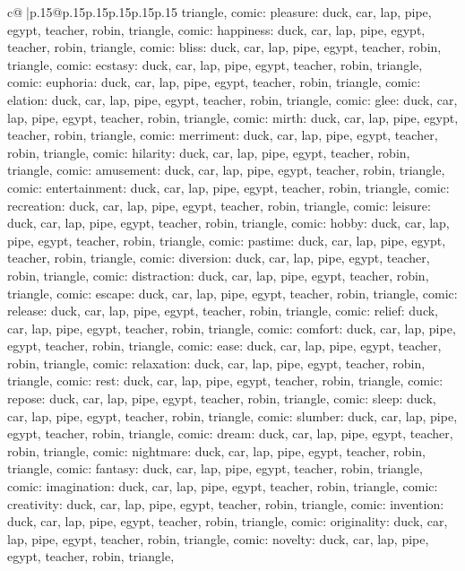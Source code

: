 \documentclass{article}
\begin{document}
{\begin{supertabular}{c@{$\;$}|p{.15\linewidth}@{}p{.15\linewidth}p{.15\linewidth}p{.15\linewidth}p{.15\linewidth}p{.15\linewidth}}
{{{triangle, comic\n\nCLUE: pleasure\nTARGETS: duck, car, lap, pipe, egypt, teacher, robin, triangle, comic\n\nCLUE: happiness\nTARGETS: duck, car, lap, pipe, egypt, teacher, robin, triangle, comic\n\nCLUE: bliss\nTARGETS: duck, car, lap, pipe, egypt, teacher, robin, triangle, comic\n\nCLUE: ecstasy\nTARGETS: duck, car, lap, pipe, egypt, teacher, robin, triangle, comic\n\nCLUE: euphoria\nTARGETS: duck, car, lap, pipe, egypt, teacher, robin, triangle, comic\n\nCLUE: elation\nTARGETS: duck, car, lap, pipe, egypt, teacher, robin, triangle, comic\n\nCLUE: glee\nTARGETS: duck, car, lap, pipe, egypt, teacher, robin, triangle, comic\n\nCLUE: mirth\nTARGETS: duck, car, lap, pipe, egypt, teacher, robin, triangle, comic\n\nCLUE: merriment\nTARGETS: duck, car, lap, pipe, egypt, teacher, robin, triangle, comic\n\nCLUE: hilarity\nTARGETS: duck, car, lap, pipe, egypt, teacher, robin, triangle, comic\n\nCLUE: amusement\nTARGETS: duck, car, lap, pipe, egypt, teacher, robin, triangle, comic\n\nCLUE: entertainment\nTARGETS: duck, car, lap, pipe, egypt, teacher, robin, triangle, comic\n\nCLUE: recreation\nTARGETS: duck, car, lap, pipe, egypt, teacher, robin, triangle, comic\n\nCLUE: leisure\nTARGETS: duck, car, lap, pipe, egypt, teacher, robin, triangle, comic\n\nCLUE: hobby\nTARGETS: duck, car, lap, pipe, egypt, teacher, robin, triangle, comic\n\nCLUE: pastime\nTARGETS: duck, car, lap, pipe, egypt, teacher, robin, triangle, comic\n\nCLUE: diversion\nTARGETS: duck, car, lap, pipe, egypt, teacher, robin, triangle, comic\n\nCLUE: distraction\nTARGETS: duck, car, lap, pipe, egypt, teacher, robin, triangle, comic\n\nCLUE: escape\nTARGETS: duck, car, lap, pipe, egypt, teacher, robin, triangle, comic\n\nCLUE: release\nTARGETS: duck, car, lap, pipe, egypt, teacher, robin, triangle, comic\n\nCLUE: relief\nTARGETS: duck, car, lap, pipe, egypt, teacher, robin, triangle, comic\n\nCLUE: comfort\nTARGETS: duck, car, lap, pipe, egypt, teacher, robin, triangle, comic\n\nCLUE: ease\nTARGETS: duck, car, lap, pipe, egypt, teacher, robin, triangle, comic\n\nCLUE: relaxation\nTARGETS: duck, car, lap, pipe, egypt, teacher, robin, triangle, comic\n\nCLUE: rest\nTARGETS: duck, car, lap, pipe, egypt, teacher, robin, triangle, comic\n\nCLUE: repose\nTARGETS: duck, car, lap, pipe, egypt, teacher, robin, triangle, comic\n\nCLUE: sleep\nTARGETS: duck, car, lap, pipe, egypt, teacher, robin, triangle, comic\n\nCLUE: slumber\nTARGETS: duck, car, lap, pipe, egypt, teacher, robin, triangle, comic\n\nCLUE: dream\nTARGETS: duck, car, lap, pipe, egypt, teacher, robin, triangle, comic\n\nCLUE: nightmare\nTARGETS: duck, car, lap, pipe, egypt, teacher, robin, triangle, comic\n\nCLUE: fantasy\nTARGETS: duck, car, lap, pipe, egypt, teacher, robin, triangle, comic\n\nCLUE: imagination\nTARGETS: duck, car, lap, pipe, egypt, teacher, robin, triangle, comic\n\nCLUE: creativity\nTARGETS: duck, car, lap, pipe, egypt, teacher, robin, triangle, comic\n\nCLUE: invention\nTARGETS: duck, car, lap, pipe, egypt, teacher, robin, triangle, comic\n\nCLUE: originality\nTARGETS: duck, car, lap, pipe, egypt, teacher, robin, triangle, comic\n\nCLUE: novelty\nTARGETS: duck, car, lap, pipe, egypt, teacher, robin, triangle, }}}
\end{supertabular}}
\end{document}
